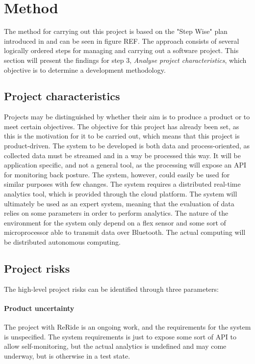 \section{Method}
\label{method}
The method for carrying out this project is based on the "Step Wise" plan introduced in \cite{books:software-project} and can be seen in figure REF. The approach consists of several logically ordered steps for managing and carrying out a software project. This section will present the findings for step 3, \textit{Analyse project characteristics}, which objective is to determine a development methodology.

\subsection{Project characteristics}
\label{proj_chars}
Projects may be distinguished by whether their aim is to produce a product or to meet certain objectives. The objective for this project has already been set, as this is the motivation for it to be carried out, which means that this project is product-driven. The system to be developed is both data and process-oriented, as collected data must be streamed and in a way be processed this way. It will be application specific, and not a general tool, as the processing will expose an API for monitoring back posture. The system, however, could easily be used for similar purposes with few changes. The system requires a distributed real-time analytics tool, which is provided through the cloud platform. The system will ultimately be used as an expert system, meaning that the evaluation of data relies on some parameters in order to perform analytics. The nature of the environment for the system only depend on a flex sensor and some sort of microprocessor able to transmit data over Bluetooth. The actual computing will be distributed autonomous computing.

\subsection{Project risks}
The high-level project risks can be identified through three parameters: 
\paragraph{Product uncertainty} The project with ReRide is an ongoing work, and the requirements for the system is unspecified. The system requirements is just to expose some sort of API to allow self-monitoring, but the actual analytics is undefined and may come underway, but is otherwise in a test state.

